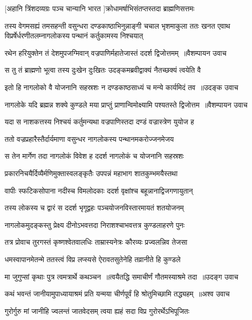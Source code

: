\twolineshloka
{[अहानि त्रिंशदव्यग्रः पञ्च चान्यानि भारत}
{]क्रोधामर्षाभिसंतप्तस्तदा ब्राह्मणिसत्तमः}


\threelineshloka
{तस्य वेगमसह्यं तमसहन्ती वसुन्धरा}
{दण्डकाष्ठाभिनुन्नाङ्गी चचाल भृशमाकुला}
{ततः खनत एवाथ विप्रर्षेर्धरणीतलम्नागलोकस्य पन्थानं कर्तुकामस्य निश्चयात्}


\threelineshloka
{रथेन हरियुक्तेन तं देशमुपजग्मिवान्}
{वज्रपाणिर्महातेजास्तं ददर्श द्विजोत्तमम् ॥वैशम्पायन उवाच}
{}


\twolineshloka
{स तु तं ब्राह्मणो भूत्वा तस्य दुःखेन दुःखितः}
{उदङ्कमब्रवीद्वाक्यं नैतच्छक्यं त्वयेति वै}


\threelineshloka
{इतो हि नागलोको वै योजनानि सहस्रशः}
{न दण्डकाष्ठसाध्यं च मन्ये कार्यमिदं तव ॥उदङ्क उवाच}
{}


\threelineshloka
{नागलोके यदि ब्रह्मन्न शक्ये कुण्डले मया}
{प्राप्तुं प्राणान्विमोक्ष्यामि पश्यतस्ते द्विजोत्तम ॥वैशम्पायन उवाच}
{}


\twolineshloka
{यदा स नाशकत्तस्य निश्चयं कर्तुमन्यथा}
{वज्रपाणिस्तदा दण्डं वज्रास्त्रेण युयोज ह}


\twolineshloka
{ततो वज्रप्रहारैस्तैर्दार्यमाणा वसुन्धर}
{नागलोकस्य पन्थानमकरोज्जनमेजय}


\twolineshloka
{स तेन मार्गेण तदा नागलोकं विवेश ह}
{ददर्श नागलोकं च योजनानि सहस्रशः}


\twolineshloka
{प्रकारनिचयैर्दिव्यैर्मणिमुक्तास्वलङ्कृतैः}
{उपपन्नं महाभाग शातकुम्भमयैस्तथा}


\twolineshloka
{वापीः स्फटिकसोपाना नदीस्च विमलोदकाः}
{ददर्श वृक्षांश्च बहून्नानाद्विजगणायुतान्}


\twolineshloka
{तस्य लोकस्य च द्वारं स ददर्श भृगूद्वहः}
{पञ्चयोजनविस्तारमायतं शतयोजनम्}


\twolineshloka
{नागलोकमुदङ्कस्तु प्रेक्ष्य दीनोऽभवत्तदा}
{निराशश्चाभवत्तत्र कुण्डलाहरणे पुनः}


\twolineshloka
{तत्र प्रोवाच तुरगस्तं कृष्णश्वेतवालधिः}
{ताम्रास्यनेत्रः कौरव्यः प्रज्वलन्निव तेजसा}


\twolineshloka
{धमस्वापानमेतन्मे ततस्त्वं विप्र लप्स्यसे}
{ऐरावतसुतेनेहि तव्रानीते हि कुण्डले}


\twolineshloka
{मा जुगुप्सां कृथाः पुत्र त्वमत्रार्थे कथञ्चन ॥त्वयैतद्धि समाचीर्णं गौतमस्याश्रमे तदा ॥उदङ्ग उवाच}
{}


\threelineshloka
{कथं भवन्तं जानीयामुपाध्यायाश्रमं प्रति}
{यन्मया चीर्णपूर्वं हि श्रोतुमिच्छामि तद्ध्यहम् ॥अश्व उवाच}
{}


\twolineshloka
{गुरोर्गुरु मां जानीहि ज्वलन्तं जातवेदसम्}
{त्वया ह्यहं सदा विप्र गुरोरर्थेऽभिपूजितः}


